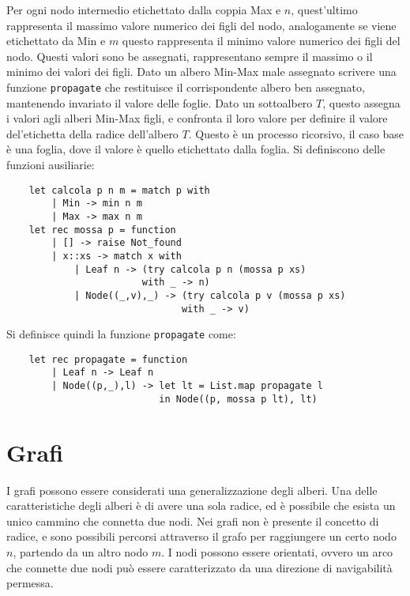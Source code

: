 \documentclass{article}
\numberwithin{equation}{subsection}
\begin{document}
Per ogni nodo intermedio etichettato dalla coppia Max e $n$, quest'ultimo rappresenta il massimo valore numerico dei figli del nodo, analogamente se viene etichettato da Min e $m$ questo rappresenta il minimo valore numerico dei figli del nodo. Questi valori sono be assegnati, rappresentano sempre il massimo o il minimo dei valori dei figli. 
Dato un albero Min-Max male assegnato scrivere una funzione \verb|propagate| che restituisce il corrispondente albero ben assegnato, mantenendo invariato il valore delle foglie. 
Dato un sottoalbero $T$, questo assegna i valori agli alberi Min-Max figli, e confronta il loro valore per definire il valore del'etichetta della radice dell'albero $T$. Questo è un processo ricorsivo, il caso base è una foglia, dove il valore è quello etichettato dalla foglia. 
Si definiscono delle funzioni ausiliarie:
\begin{verbatim}
    let calcola p n m = match p with
        | Min -> min n m
        | Max -> max n m
    let rec mossa p = function
        | [] -> raise Not_found
        | x::xs -> match x with
            | Leaf n -> (try calcola p n (mossa p xs)
                        with _ -> n)
            | Node((_,v),_) -> (try calcola p v (mossa p xs)
                               with _ -> v)
\end{verbatim}
Si definisce quindi la funzione \verb|propagate| come:
\begin{verbatim}
    let rec propagate = function
        | Leaf n -> Leaf n
        | Node((p,_),l) -> let lt = List.map propagate l
                           in Node((p, mossa p lt), lt)
\end{verbatim}

\clearpage

\section{Grafi}

I grafi possono essere considerati una generalizzazione degli alberi. Una delle caratteristiche degli alberi è di avere una sola radice, ed è possibile che esista un unico cammino che connetta due nodi. 
Nei grafi non è presente il concetto di radice, e sono possibili percorsi attraverso il grafo per raggiungere un certo nodo $n$, partendo da un altro nodo $m$. I nodi possono essere orientati, ovvero un arco che connette due nodi può essere caratterizzato da una direzione di navigabilità permessa. 
\end{document}
